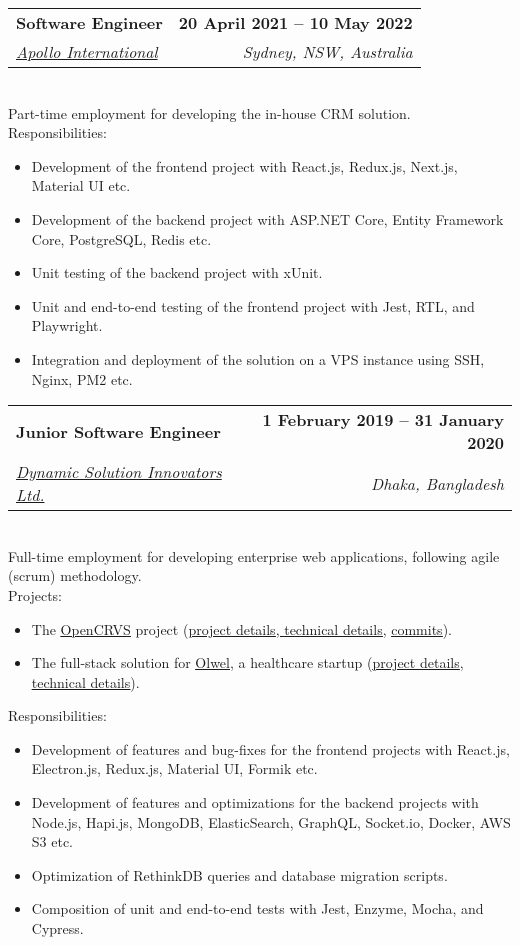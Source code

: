 \documentclass[12pt,a4paper]{article}
\makeatletter
\newcommand{\resumeItem}[1]{
  \item{
    {#1 \vspace{-2pt}}
  }
}
\newcommand{\resumeSubheading}[4]{
  \vspace{-2pt}\item
    \begin{tabular*}{1.0\textwidth}[t]{l@{\extracolsep{\fill}}r}
      \textbf{#1} & \textbf{\small #2} \\
      \textit{\small#3} & \textit{\small #4} \\
    \end{tabular*}\vspace{-7pt}
}
\newcommand{\resumeItemListStart}{\begin{itemize}}
\newcommand{\resumeItemListEnd}{\end{itemize}\vspace{-5pt}}
\makeatother
\begin{document}
    \resumeSubheading
      {Software Engineer}{20 April 2021 -- 10 May 2022}
      {\href{https://www.apollointl.com.au}{Apollo International}}{Sydney, NSW, Australia}
      \\ \vspace{8pt} Part-time employment for developing the in-house CRM solution. \vspace{-4pt}
      \\ \vspace{6pt} Responsibilities: \vspace{-4pt}
      \resumeItemListStart
        \resumeItem{Development of the frontend project with React.js, Redux.js,  Next.js, Material UI etc.}
        \resumeItem{Development of the backend project with ASP.NET Core, Entity Framework Core, PostgreSQL, Redis etc.}
        \resumeItem{Unit testing of the backend project with xUnit.}
        \resumeItem{Unit and end-to-end testing of the frontend project with Jest, RTL, and Playwright.}
        \resumeItem{Integration and deployment of the solution on a VPS instance using SSH, Nginx, PM2 etc.}
      \resumeItemListEnd

    \resumeSubheading
      {Junior Software Engineer}{1 February 2019 -- 31 January 2020}
      {\href{https://www.dsinnovators.com}{Dynamic Solution Innovators Ltd.}}{Dhaka, Bangladesh}
      \\ \vspace{8pt} Full-time employment for developing enterprise web applications, following agile (scrum) methodology. \vspace{-4pt}
      \\ \vspace{6pt} Projects: \vspace{-4pt}
      \resumeItemListStart
      \resumeItem{The \href{https://www.opencrvs.org}{\underline{OpenCRVS}} project (\href{https://www.dsinnovators.com/casestudies/open-crvs-2}{\href{https://www.dsinnovators.com/projects/open-crvs}{\underline{project details}}, \underline{technical details}}, \href{https://github.com/opencrvs/opencrvs-core/commits?author=maacpiash}{\underline{commits}}).}
      \resumeItem{The full-stack solution for \href{https://www.olwel.com}{\underline{Olwel}}, a healthcare startup (\href{https://www.dsinnovators.com/projects/olwel}{\underline{project details}}, \href{https://www.dsinnovators.com/casestudies/olwel-2}{\underline{technical details}}).}
      \resumeItemListEnd
      \vspace{1pt} Responsibilities: \vspace{-4pt}
      \resumeItemListStart
        \resumeItem{Development of features and bug-fixes for the frontend projects with React.js, Electron.js, Redux.js, Material UI, Formik etc.}
        \resumeItem{Development of features and optimizations for the backend projects with Node.js, Hapi.js, MongoDB, ElasticSearch, GraphQL, Socket.io, Docker, AWS S3 etc.}
        \resumeItem{Optimization of RethinkDB queries and database migration scripts.}
        \resumeItem{Composition of unit and end-to-end tests with Jest, Enzyme, Mocha, and Cypress.}
    \resumeItemListEnd
\end{document}
